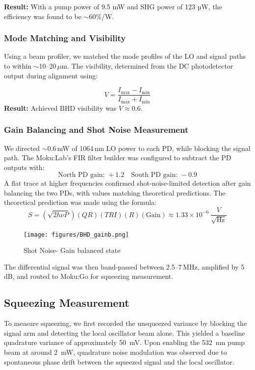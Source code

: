 \documentclass[colorlinks=true,pdfstartview=FitV,linkcolor=blue,
citecolor=red,urlcolor=magenta]{ligodoc}
\begin{document}
\textbf{Result:} With a pump power of 9.5 mW and SHG power of 123 µW, the efficiency was found to be $\sim$60\%/W.

\subsubsection{Mode Matching and Visibility}

Using a beam profiler, we matched the mode profiles of the LO and signal paths to within $\sim$10--20\,$\mu$m. The visibility, determined from the DC photodetector output during alignment using:

\[
V = \frac{I_{\text{max}} - I_{\text{min}}}{I_{\text{max}} + I_{\text{min}}}
\]
\textbf{Result:} Achieved BHD visibility was $V \approx 0.6$.

\subsubsection{Gain Balancing and Shot Noise Measurement}

We directed $\sim$0.6\,mW of 1064\,nm LO power to each PD, while blocking the signal path. The Moku:Lab's FIR filter builder was configured to subtract the PD outputs with:
\[
\text{North PD gain: } +1.2 \quad \text{South PD gain: } -0.9
\]
A flat trace at higher frequencies confirmed shot-noise-limited detection after gain balancing the two PDs, with values matching theoretical predictions. The theoretical prediction was made using the formula:
\[
S = \left( \sqrt{2 h \nu P} \right)(QR)(TRI)(R)(\text{Gain}) \approx 1.33 \times 10^{-6}~\frac{V}{\sqrt{\text{Hz}}}
\]
\begin{figure}[H]
    \centering
    \texttt{[image: figures/BHD\_gainb.png]}
   \caption{ Shot Noise- Gain balanced state }
    \label{fig:enter-label}
\end{figure}
The differential signal was then band-passed between 2.5--7\,MHz, amplified by 5\,dB, and routed to Moku:Go for squeezing measurement.

\subsection{Squeezing Measurement}
To measure squeezing, we first recorded the unsqueezed variance by blocking the signal arm and detecting the local oscillator beam alone. This yielded a baseline quadrature variance of approximately 50~mV. Upon enabling the 532~nm pump beam at around 2~mW, quadrature noise modulation was observed due to spontaneous phase drift between the squeezed signal and the local oscillator.
\end{document}
